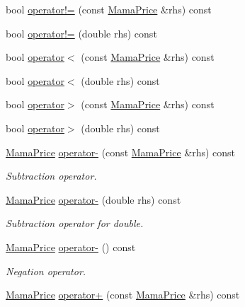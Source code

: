 \begin{DoxyCompactItemize}
\item 
bool \hyperlink{classWombat_1_1MamaPrice_a6ab9360ae864e9f16b88118b37db36ef}{operator!=} (const \hyperlink{classWombat_1_1MamaPrice}{MamaPrice} \&rhs) const 
\item 
bool \hyperlink{classWombat_1_1MamaPrice_a79eb672210ac523c911a16116bf834cd}{operator!=} (double rhs) const 
\item 
bool \hyperlink{classWombat_1_1MamaPrice_a75a7c77e3b6aa23bd4c83d8983d55a06}{operator$<$} (const \hyperlink{classWombat_1_1MamaPrice}{MamaPrice} \&rhs) const 
\item 
bool \hyperlink{classWombat_1_1MamaPrice_a78bd049e500408f2f9cd82349c157653}{operator$<$} (double rhs) const 
\item 
bool \hyperlink{classWombat_1_1MamaPrice_a15247a3fd3b5ec23532836f0f1a543e3}{operator$>$} (const \hyperlink{classWombat_1_1MamaPrice}{MamaPrice} \&rhs) const 
\item 
bool \hyperlink{classWombat_1_1MamaPrice_a30a0d7f7b1f829ae5f09d07413a28021}{operator$>$} (double rhs) const 
\item 
\hyperlink{classWombat_1_1MamaPrice}{MamaPrice} \hyperlink{classWombat_1_1MamaPrice_ae9b64c29f40da554a1153bc13eedd1bf}{operator-\/} (const \hyperlink{classWombat_1_1MamaPrice}{MamaPrice} \&rhs) const 
\begin{DoxyCompactList}\small\item\em Subtraction operator. \item\end{DoxyCompactList}\item 
\hyperlink{classWombat_1_1MamaPrice}{MamaPrice} \hyperlink{classWombat_1_1MamaPrice_a94e9fa5bf6b7056ca4cb55c14628869a}{operator-\/} (double rhs) const 
\begin{DoxyCompactList}\small\item\em Subtraction operator for double. \item\end{DoxyCompactList}\item 
\hyperlink{classWombat_1_1MamaPrice}{MamaPrice} \hyperlink{classWombat_1_1MamaPrice_ac2c40fd47283c9f703a2f364880138c6}{operator-\/} () const 
\begin{DoxyCompactList}\small\item\em Negation operator. \item\end{DoxyCompactList}\item 
\hyperlink{classWombat_1_1MamaPrice}{MamaPrice} \hyperlink{classWombat_1_1MamaPrice_a9ec014c02cdee65cf06c1e96e6338c92}{operator+} (const \hyperlink{classWombat_1_1MamaPrice}{MamaPrice} \&rhs) const 

\end{DoxyCompactItemize}
